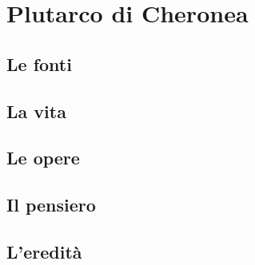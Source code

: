 \chapter{Plutarco di Cheronea}

\section{Le fonti}

\section{La vita}

\section{Le opere}

\section{Il pensiero}

\section{L'eredità}
